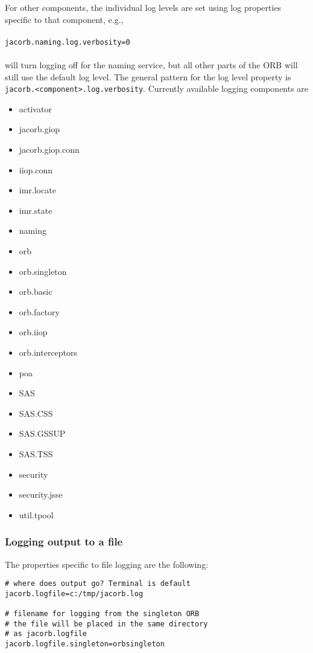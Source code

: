 {{For other components, the individual log levels are set using log
properties specific to that component, e.g.,\\
\\
{\tt jacorb.naming.log.verbosity=0}\\
\\
will turn logging off for the naming service, but all other parts of
the ORB will still use the default log level. The general pattern for
the log level property is {\tt jacorb.<component>.log.verbosity}.
Currently available logging components are
\begin{small}
\begin{itemize}
\item activator
\item jacorb.giop
\item jacorb.giop.conn
\item iiop.conn
\item imr.locate
\item imr.state
\item naming
\item orb
\item orb.singleton
\item orb.basic
\item orb.factory
\item orb.iiop
\item orb.interceptors
\item poa
\item SAS
\item SAS.CSS
\item SAS.GSSUP
\item SAS.TSS
\item security
\item security.jsse
\item util.tpool
\end{itemize}
\end{small}

\subsubsection*{Logging output to a file}

The properties specific to file logging are the following:

\renewcommand{\baselinestretch}{0.9}
\small{
\begin{verbatim}
# where does output go? Terminal is default
jacorb.logfile=c:/tmp/jacorb.log

# filename for logging from the singleton ORB
# the file will be placed in the same directory
# as jacorb.logfile
jacorb.logfile.singleton=orbsingleton


\end{verbatim}}}}
